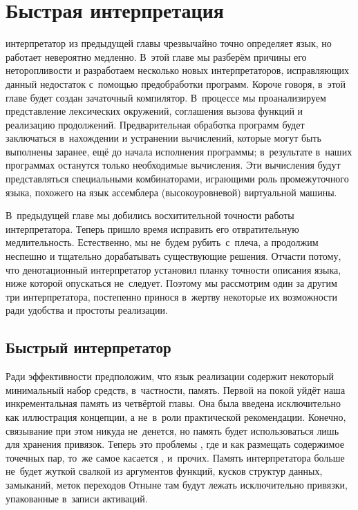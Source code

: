 \chapter{Быстрая интерпретация}\label{chapter:fast}

 интерпретатор из предыдущей
главы чрезвычайно точно определяет язык, но работает невероятно медленно. В~этой
главе мы разберём причины его неторопливости и разработаем несколько новых
интерпретаторов, исправляющих данный недостаток с~помощью предобработки
программ. Короче говоря, в~этой главе будет создан зачаточный компилятор.
В~процессе мы проанализируем представление лексических окружений, соглашения
вызова функций и реализацию продолжений. Предварительная обработка программ
будет заключаться в~нахождении и устранении вычислений, которые могут быть
выполнены заранее, ещё до начала исполнения программы; в~результате в~наших
программах останутся только необходимые вычисления. Эти вычисления будут
представляться специальными комбинаторами, играющими роль промежуточного языка,
похожего на язык ассемблера (высокоуровневой) виртуальной машины.

\bigskip

В~предыдущей главе мы добились восхитительной точности работы интерпретатора.
Теперь пришло время исправить его отвратительную медлительность. Естественно,
мы не~будем рубить~с~плеча, а продолжим неспешно и тщательно дорабатывать
существующие решения. Отчасти потому, что денотационный интерпретатор установил
планку точности описания языка, ниже которой опускаться не~следует. Поэтому мы
рассмотрим один за другим три интерпретатора, постепенно принося в~жертву
некоторые их возможности ради удобства и простоты реализации.


\section{Быстрый интерпретатор}\label{fast/sect:fast}

Ради эффективности предположим, что язык реализации содержит некоторый
минимальный набор средств, в~частности, память. Первой на покой уйдёт наша
инкрементальная память из четвёртой главы.  Она
была введена исключительно как иллюстрация концепции, а не~в~роли практической
рекомендации. Конечно, связывание при этом никуда не~денется, но память будет
использоваться лишь для хранения привязок. Теперь это проблемы , где и
как размещать содержимое точечных пар, то~же самое касается ,
 и~прочих. Память интерпретатора больше не~будет жуткой свалкой из
аргументов функций, кусков структур данных, замыканий, меток переходов {\itp}
Отныне там будут лежать исключительно привязки, упакованные в~записи активаций.



